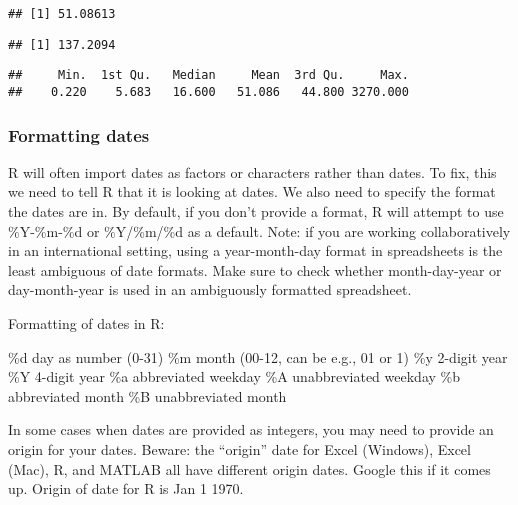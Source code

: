 \documentclass[]{article}
\newenvironment{Shaded}{\begin{snugshade}}{\end{snugshade}}
\newcommand{\KeywordTok}[1]{\textcolor[rgb]{0.13,0.29,0.53}{\textbf{#1}}}
\newcommand{\NormalTok}[1]{#1}
\newcommand{\OperatorTok}[1]{\textcolor[rgb]{0.81,0.36,0.00}{\textbf{#1}}}
\begin{document}
\begin{verbatim}
## [1] 51.08613
\end{verbatim}

\begin{Shaded}
\end{Shaded}

\begin{verbatim}
## [1] 137.2094
\end{verbatim}

\begin{Shaded}
\end{Shaded}

\begin{verbatim}
##     Min.  1st Qu.   Median     Mean  3rd Qu.     Max. 
##    0.220    5.683   16.600   51.086   44.800 3270.000
\end{verbatim}

\hypertarget{formatting-dates}{%
\subsubsection{Formatting dates}\label{formatting-dates}}

R will often import dates as factors or characters rather than dates. To
fix, this we need to tell R that it is looking at dates. We also need to
specify the format the dates are in. By default, if you don't provide a
format, R will attempt to use \%Y-\%m-\%d or \%Y/\%m/\%d as a default.
Note: if you are working collaboratively in an international setting,
using a year-month-day format in spreadsheets is the least ambiguous of
date formats. Make sure to check whether month-day-year or
day-month-year is used in an ambiguously formatted spreadsheet.

Formatting of dates in R:

\%d day as number (0-31) \%m month (00-12, can be e.g., 01 or 1) \%y
2-digit year \%Y 4-digit year \%a abbreviated weekday \%A unabbreviated
weekday \%b abbreviated month \%B unabbreviated month

In some cases when dates are provided as integers, you may need to
provide an origin for your dates. Beware: the ``origin'' date for Excel
(Windows), Excel (Mac), R, and MATLAB all have different origin dates.
Google this if it comes up. Origin of date for R is Jan 1 1970.
\end{document}
